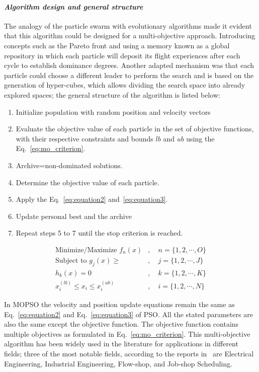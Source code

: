 \paragraph{\textit{Algorithm design and general structure}}

The analogy of the particle swarm with evolutionary algorithms made it evident that this algorithm could be designed for a multi-objective approach. Introducing concepts such as the Pareto front and using a memory known as a global repository in which each particle will deposit its flight experiences after each cycle to establish dominance degrees.
Another adapted mechanism was that each particle could choose a different leader to perform the search and is based on the generation of hyper-cubes, which allows dividing the search space into already explored spaces; the general structure of the algorithm is listed below:

\begin{enumerate}
    \item Initialize population with random position and velocity vectors
    \item Evaluate the objective value of each particle in the set of objective functions, with their respective constraints and bounds $lb$ and $ub$ using the Eq.~\ref{eq:mo_criterion}.
    \item Archive=non-dominated solutions.
    \item Determine the objective value of each particle.
    \item Apply the Eq.~\ref{eq:equation2} and~\ref{eq:equation3}.
    \item Update personal best and the archive
    \item Repeat steps 5 to 7 until the stop criterion is reached.
\end{enumerate}

\begin{equation}
\begin{split}\label{eq:mo_criterion}
    \text{Minimize/Maximize } f_n (x) &,\quad n=\{1,2,\cdots,O\}\\
    \text{Subject to } g_j(x) \geq &, \quad j = \{1,2,\cdots,J\}\\
    h_k(x)=0 &, \quad k=\{1,2,\cdots,K\}\\
    x_i^{(lb)} \leq x_i \leq x_i^{(ub)} &, \quad i=\{1,2,\cdots,N\}
\end{split}
\end{equation} 


In MOPSO the velocity and position update equations remain the same as Eq.~\eqref{eq:equation2} and Eq.~\eqref{eq:equation3} of PSO. All the stated parameters are also the same except the objective function. The objective function contains multiple objectives as formulated in Eq.~\eqref{eq:mo_criterion}.
This multi-objective algorithm has been widely used in the literature for applications in different fields; three of the most notable fields, according to the reports in~\cite{lalwani2013comprehensive} are Electrical Engineering, Industrial Engineering, Flow-shop, and Job-shop Scheduling.

